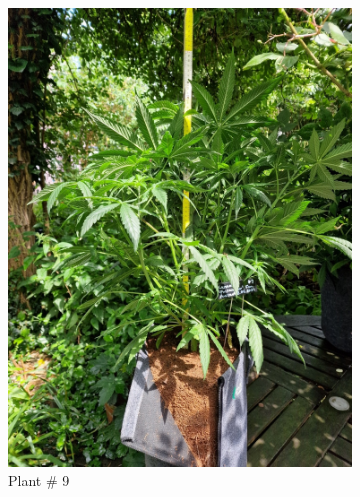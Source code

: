 \begin{figure}[htbp]
\begin{subfigure}[t]{.28\textwidth}
        \includegraphics[width=\linewidth]{plant_09_2024-06-17}
        \caption{Plant \# 9}
        \label{fig:plant_09_2024-06-17}
    \end{subfigure}
    \begin{subfigure}[t]{.28\textwidth}

\end{subfigure}
\end{figure}

